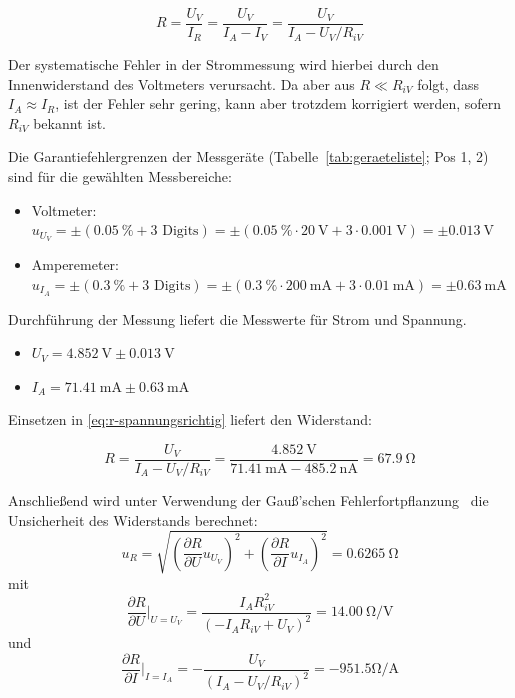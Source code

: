 \begin{equation}
R = \frac{U_V}{I_R} = \frac{U_V}{I_A-I_V} = \frac{U_V}{I_A-U_V/R_{iV}}
\label{eq:r-spannungsrichtig}
\end{equation}

Der systematische Fehler in der Strommessung wird hierbei durch den
Innenwiderstand des Voltmeters verursacht. Da aber aus $R \ll R_{iV}$ folgt,
dass $I_A \approx I_R$, ist der Fehler sehr gering, kann aber trotzdem
korrigiert werden, sofern $R_{iV}$ bekannt ist.

\marginref{\ref{itm:1-P1-4}}
Die Garantiefehlergrenzen der Messgeräte (Tabelle~\ref{tab:geraeteliste}; Pos 1, 2) sind für die gewählten Messbereiche:
\begin{itemize}
    \item Voltmeter: $u_{U_V} = \pm(\SI{0.05}{\percent} + 3 \text{ Digits})
        = \pm(\SI{0.05}{\percent} \cdot \SI{20}{\volt} + 3 \cdot \SI{0.001}{\volt})
        = \pm \SI{0.013}{\volt}$
    \item Amperemeter: $u_{I_A} = \pm(\SI{0.3}{\percent} + 3 \text{ Digits})
        = \pm(\SI{0.3}{\percent} \cdot \SI{200}{\milli\ampere} + 3 \cdot \SI{0.01}{\milli\ampere})
        = \pm \SI{0.63}{\milli\ampere}$
\end{itemize}

\marginref{\ref{itm:1-P1-5}}
Durchführung der Messung liefert die Messwerte für Strom und Spannung.

\begin{itemize}
    \item $U_V = \SI{4.852}{\volt} \pm \SI{0.013}{\volt}$
    \item $I_A = \SI{71.41}{\milli\ampere} \pm \SI{0.63}{\milli\ampere}$ 
\end{itemize}

Einsetzen in \autoref{eq:r-spannungsrichtig} liefert den Widerstand:

\begin{equation}
    R = \frac{U_V}{I_A - U_V/R_{iV}} = \frac{\SI{4.852}{\volt}}{\SI{71.41}{\milli\ampere} - \SI{485.2}{\nano\ampere}} = \SI{67.9}{\ohm}
    \label{eq:r-value}
\end{equation}

Anschließend wird unter Verwendung der Gauß'schen Fehlerfortpflanzung~\cite[Gl.~1.80]{SchrüferElmar2022EM:M}
die Unsicherheit des Widerstands berechnet:
\[
    u_R = \sqrt{{\left(\frac{\partial R}{\partial U}u_{U_V}\right)}^2 + {\left(\frac{\partial R}{\partial I}u_{I_A}\right)}^2} = \SI{0.6265}{\ohm}
\]
mit
\[
    \frac{\partial R}{\partial U}\Big|_{U=U_V} = \frac{I_A R_{iV}^2}{{(-I_A R_{iV} + U_V)}^2} =  \SI{14.00}{\ohm\per\volt}
\]
und
\[
    \frac{\partial R}{\partial I}\Big|_{I=I_A} = -\frac{U_{V}}{{(I_A - U_V/R_{iV})}^2} = -951.5 \si{\ohm\per\ampere}
\]

